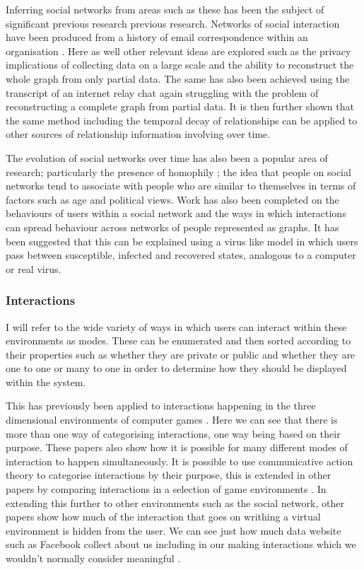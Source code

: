 \documentclass[12pt,a4paper]{article}
\begin{document}
Inferring social networks from areas such as these has been the subject of significant previous research previous research. Networks of social interaction have been produced from a history of email correspondence within an organisation \cite{fisher2004social}. Here as well other relevant ideas are explored such as the privacy implications of collecting data on a large scale and the ability to reconstruct the whole graph from only partial data. The same has also been achieved using the transcript of an internet relay chat \cite{mutton2004inferring} again struggling with the problem of reconstructing a complete graph from partial data. It is then further shown that the same method including the temporal decay of relationships can be applied to other sources of relationship information involving over time.

The evolution of social networks over time has also been a popular area of research; particularly the presence of homophily \cite{adamic2003friends}; the idea that people on social networks tend to associate with people who are similar to themselves in terms of factors such as age and political views. Work has also been completed on the behaviours of users within a social network and the ways in which interactions can spread behaviour across networks of people represented as graphs. It has been suggested that this can be explained using a virus like model \cite{centola2010spread} in which users pass between susceptible, infected and recovered states, analogous to a computer or real virus.

\subsubsection{Interactions}
I will refer to the wide variety of ways in which users can interact within these environments as modes. These can be enumerated and then sorted according to their properties such as whether they are private or public and whether they are one to one or many to one in order to determine how they should be displayed within the system.

This has previously been applied to interactions happening in the three dimensional environments of computer games \cite{manninen2000interaction}. Here we can see that there is more than one way of categorising interactions, one way being based on their purpose. These papers also show how it is possible for many different modes of interaction to happen simultaneously. It is possible to use communicative action theory to categorise interactions by their purpose, this is extended in other papers by comparing interactions in a selection of game environments \cite{becker2002social}. In extending this further to other environments such as the social network, other papers show how much of the interaction that goes on writhing a virtual environment is hidden from the user. We can see just how much data website such as Facebook collect about us including in our making interactions which we wouldn't normally consider meaningful \cite{schneier2010taxonomy}.
\end{document}

